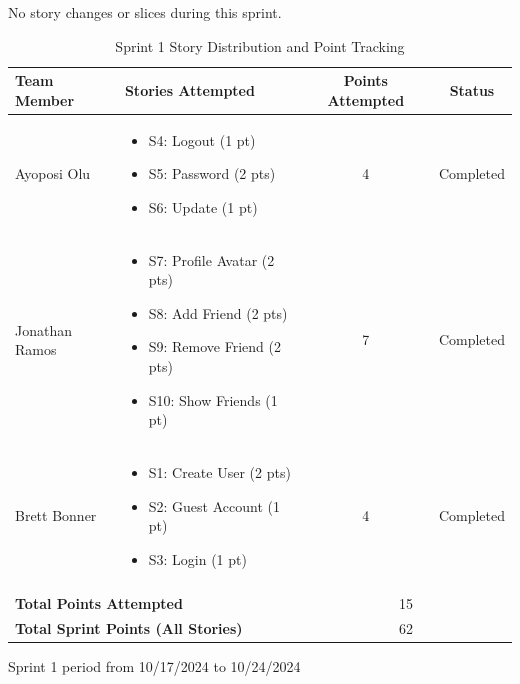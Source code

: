  

\begin{table}[h]
\centering
No story changes or slices during this sprint.

\caption{Sprint 1 Story Distribution and Point Tracking}
\begin{tabular}{|p{3cm}|p{6cm}|c|c|}
\hline
\textbf{Team Member} & \textbf{Stories Attempted} & \textbf{Points Attempted} & \textbf{Status} \\
\hline
Ayoposi Olu & 
\begin{itemize}
    \item S4: Logout (1 pt)
    \item S5: Password (2 pts)
    \item S6: Update (1 pt)
\end{itemize} & 
4 & 
Completed \\
\hline
Jonathan Ramos & 
\begin{itemize}
    \item S7: Profile Avatar (2 pts)
    \item S8: Add Friend (2 pts)
    \item S9: Remove Friend (2 pts)
    \item S10: Show Friends (1 pt)
\end{itemize}& 
7 & 
Completed \\
\hline
Brett Bonner & 
\begin{itemize}
    \item S1: Create User (2 pts)
    \item S2: Guest Account (1 pt)
    \item S3: Login (1 pt)
\end{itemize} & 
4 & 
Completed \\
\hline
\multicolumn{4}{|c|}{} \\
\hline
\multicolumn{2}{|l|}{\textbf{Total Points Attempted}} & \multicolumn{2}{c|}{15} \\
\hline
\multicolumn{2}{|l|}{\textbf{Total Sprint Points (All Stories)}} & \multicolumn{2}{c|}{62} \\
\hline
\end{tabular}

\vspace{0.5cm}
\begin{center}
\small{Sprint 1 period from 10/17/2024 to 10/24/2024}
\end{center}
\end{table}

